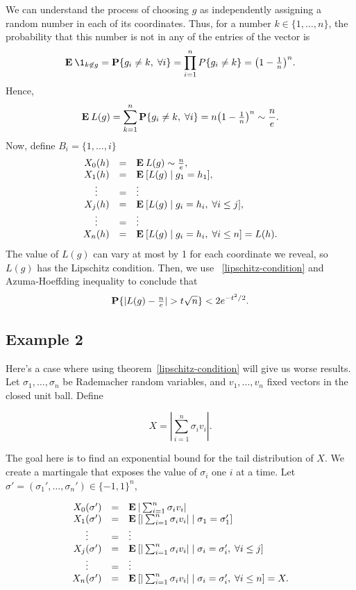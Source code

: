We can understand the process of choosing $g$ as independently assigning a random number in each of its coordinates. Thus, for a number $k \in \{1,\ldots, n\}$, the probability that this number is not in any of the entries of the vector is
\[\E \1_{k \not\in g} = \P\{g_i \neq k, \; \forall i\} = \prod_{i = 1}^n P\{g_i \neq k\} = {\left(1-\tfrac{1}{n}\right)}^n. \] 
Hence,
\[ \E L(g) = \sum_{k = 1}^n \P\{g_i \neq k, \; \forall i\} = n {\left(1-\tfrac{1}{n}\right)}^n \sim \frac{n}{e}. \] 
Now, define $B_i = \{1, \ldots, i\}$
\[\begin{array}{rcl}
    X_0(h) & = & \E L(g) \sim \frac{n}{e},\\
    X_1(h) & = & \E [ L(g) \;|\; g_1 = h_1 ], \\
    \hfill\vdots\hfill & = & \vdots \\
    X_j(h) & = & \E [L(g) \;|\; g_i = h_i,\; \forall i\leq j ],\\
    \hfill\vdots\hfill & = & \vdots \\
    X_n(h) & = & \E [L(g) \;|\; g_i = h_i,\; \forall i\leq n] = L(h).
\end{array} \] 
The value of $L(g)$ can vary at most by 1 for each coordinate we reveal, so $L(g)$ has the Lipschitz condition. Then, we use ~\ref{lipschitz-condition} and Azuma-Hoeffding inequality to conclude that
\[ \P\{|L(g) - \tfrac{n}{e}| > t\sqrt{n}\} < 2e^{-t^2 / 2}. \] 

\subsection*{Example 2}
Here's a case where using {theorem}~\ref{lipschitz-condition} will give us worse results. Let $\sigma_1,\ldots, \sigma_n$ be Rademacher random variables, and $v_1,\ldots, v_n$ fixed vectors in the closed unit ball. Define

\[ X = \left| \sum_{i = 1}^n \sigma_i v_i \right|.\]

The goal here is to find an exponential bound for the tail distribution of $X$. We create a martingale that exposes the value of $\sigma_i$ one $i$ at a time. Let $\sigma' = (\sigma_1',\ldots, \sigma_n') \in {\{-1,1\}}^n$,

\[\begin{array}{rcl}
    X_0(\sigma') & = & \E |\sum_{i = 1}^n \sigma_i v_i|\\
    X_1(\sigma') & = & \E [ |\sum_{i = 1}^n \sigma_i v_i| \;|\; \sigma_1 = \sigma_1' ] \\
    \hfill\vdots\hfill & = & \vdots \\
    X_j(\sigma') & = & \E [|\sum_{i = 1}^n \sigma_i v_i| \;|\; \sigma_i = \sigma_i',\; \forall i\leq j ]\\
    \hfill\vdots\hfill & = & \vdots \\
    X_n(\sigma') & = & \E [|\sum_{i = 1}^n \sigma_i v_i| \;|\; \sigma_i = \sigma_i',\; \forall i\leq n] = X.
\end{array} \]

